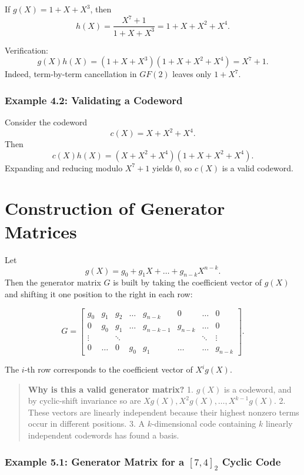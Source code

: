 \documentclass[11pt,oneside]{book}
\theoremstyle{plain}
\theoremstyle{definition}
\theoremstyle{remark}
\begin{document}
If \(g(X)=1+X+X^3\), then \[h(X)=\frac{X^7+1}{1+X+X^3}=1+X+X^2+X^4.\]

Verification: \[g(X)h(X)=(1+X+X^3)(1+X+X^2+X^4)=X^7+1.\] Indeed,
term-by-term cancellation in \(GF(2)\) leaves only \(1+X^7\).

\subsubsection{Example 4.2: Validating a
Codeword}\label{example-4.2-validating-a-codeword}

Consider the codeword \[c(X)=X+X^2+X^4.\] Then
\[c(X)h(X) = (X+X^2+X^4)(1+X+X^2+X^4).\] Expanding and reducing modulo
\(X^7+1\) yields 0, so \(c(X)\) is a valid codeword.


\section{Construction of Generator Matrices}\label{sec:generator-matrices}

Let \[g(X)=g_0+g_1X+\dots+g_{n-k}X^{n-k}.\] Then the generator matrix
\(G\) is built by taking the coefficient vector of \(g(X)\) and shifting
it one position to the right in each row:

\[G = \begin{bmatrix}
g_0 & g_1 & g_2 & \dots & g_{n-k} & 0 & \dots & 0 \\
0 & g_0 & g_1 & \dots & g_{n-k-1} & g_{n-k} & \dots & 0 \\
\vdots & & \ddots & & & & \ddots & \vdots \\
0 & \dots & 0 & g_0 & g_1 & \dots & \dots & g_{n-k}
\end{bmatrix}.\]

The \(i\)-th row corresponds to the coefficient vector of \(X^i g(X)\).

\begin{quote}
\textbf{Why is this a valid generator matrix?} 1. \(g(X)\) is a
codeword, and by cyclic-shift invariance so are
\(Xg(X),X^2g(X),\dots,X^{k-1}g(X)\). 2. These vectors are linearly
independent because their highest nonzero terms occur in different
positions. 3. A \(k\)-dimensional code containing \(k\) linearly
independent codewords has found a basis.
\end{quote}

\subsubsection{\texorpdfstring{Example 5.1: Generator Matrix for a
\([7,4]_2\) Cyclic
Code}{Example 5.1: Generator Matrix for a {[}7,4{]}\_2 Cyclic Code}}\label{example-5.1-generator-matrix-for-a-74_2-cyclic-code}
\end{document}

